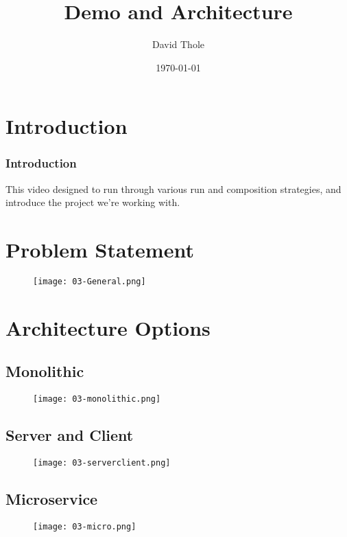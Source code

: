 \documentclass{beamer}
\begin{document}
\title{Demo and Architecture}
\author{David Thole}
\date{\today} 
\begin{frame}
  \titlepage
\end{frame}

\section{Introduction}
\begin{frame}\frametitle{Introduction}
  This video designed to run through various run and composition strategies, and introduce the project we're working with.
\end{frame}
\section{Problem Statement}
\begin{frame}
  \begin{figure}
    \texttt{[image: 03-General.png]}
  \end{figure}
\end{frame}
\section{Architecture Options}
\subsection{Monolithic}
\begin{frame}
  \begin{figure}
    \texttt{[image: 03-monolithic.png]}
  \end{figure}
\end{frame}
\subsection{Server and Client}
\begin{frame}
  \begin{figure}
    \texttt{[image: 03-serverclient.png]}
  \end{figure}
\end{frame}
\subsection{Microservice}
\begin{frame}
  \begin{figure}
    \texttt{[image: 03-micro.png]}
  \end{figure}
\end{frame}
\end{document}
